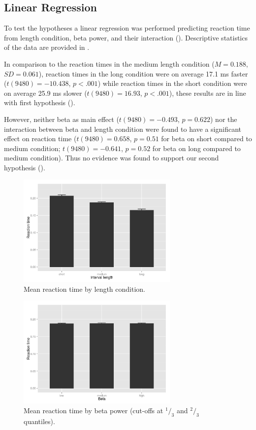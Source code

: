 \documentclass[man,floatsintext]{apa6} %
\begin{document}
\subsection{Linear Regression}
To test the hypotheses a linear regression was performed predicting
reaction time from length condition, beta power, and their interaction
(). Descriptive statistics of the data are
provided in .

In comparison to the reaction times in the medium length condition ($M
= 0.188$, $SD = 0.061$), reaction times in the long condition were on
average 17.1 ms faster ($t(9480) = -10.438$, $p < .001$) while
reaction times in the short condition were on average 25.9 ms slower
($t(9480) = 16.93$, $p < .001$), these results are in line with first
hypothesis ().

However, neither beta as main effect ($t(9480) = -0.493$, $p = 0.622$)
nor the interaction between beta and length condition were found to
have a significant effect on reaction time ($t(9480) = 0.658$, $p =
0.51$ for beta on short compared to medium condition; $t(9480) =
-0.641$, $p = 0.52$ for beta on long compared to medium
condition). Thus no evidence was found to support our second hypothesis
().

\begin{figure}[!h]
  \includegraphics[width=0.7\textwidth]{actual_rt_by_length}
  \caption{Mean reaction time by length condition.}
  \label{fig:rt_by_length}
\end{figure}

\begin{figure}[!h]
  \includegraphics[width=0.7\textwidth]{actual_rt_by_beta}
  \caption{Mean reaction time by beta power (cut-offs at $^1/_3$ and $^2/_3$ quantiles).}
  \label{fig:rt_by_beta}
\end{figure}
\end{document}
